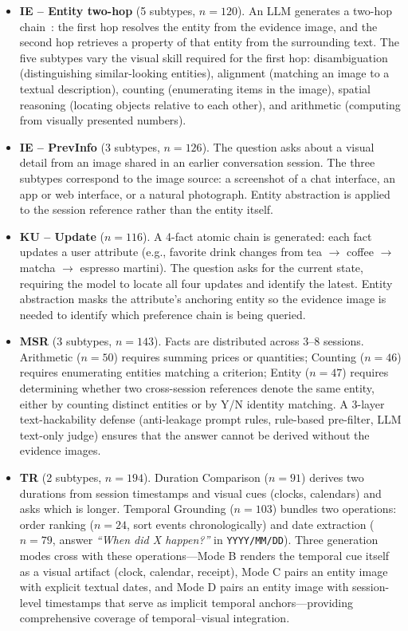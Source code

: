 \documentclass{article}
\begin{document}
\begin{itemize}
    \item \textbf{IE -- Entity two-hop} (5 subtypes, $n=120$). An LLM generates a two-hop chain~\cite{chang2022webqa}: the first hop resolves the entity from the evidence image, and the second hop retrieves a property of that entity from the surrounding text. The five subtypes vary the visual skill required for the first hop: disambiguation (distinguishing similar-looking entities), alignment (matching an image to a textual description), counting (enumerating items in the image), spatial reasoning (locating objects relative to each other), and arithmetic (computing from visually presented numbers).

    \item \textbf{IE -- PrevInfo} (3 subtypes, $n=126$). The question asks about a visual detail from an image shared in an earlier conversation session. The three subtypes correspond to the image source: a screenshot of a chat interface, an app or web interface, or a natural photograph. Entity abstraction is applied to the session reference rather than the entity itself.

    \item \textbf{KU -- Update} ($n=116$). A 4-fact atomic chain is generated: each fact updates a user attribute (e.g., favorite drink changes from tea $\to$ coffee $\to$ matcha $\to$ espresso martini). The question asks for the current state, requiring the model to locate all four updates and identify the latest. Entity abstraction masks the attribute's anchoring entity so the evidence image is needed to identify which preference chain is being queried.

    \item \textbf{MSR} (3 subtypes, $n=143$). Facts are distributed across 3--8 sessions. Arithmetic ($n=50$) requires summing prices or quantities; Counting ($n=46$) requires enumerating entities matching a criterion; Entity ($n=47$) requires determining whether two cross-session references denote the same entity, either by counting distinct entities or by Y/N identity matching. A 3-layer text-hackability defense (anti-leakage prompt rules, rule-based pre-filter, LLM text-only judge) ensures that the answer cannot be derived without the evidence images.

    \item \textbf{TR} (2 subtypes, $n=194$). Duration Comparison ($n=91$) derives two durations from session timestamps and visual cues (clocks, calendars) and asks which is longer. Temporal Grounding ($n=103$) bundles two operations: order ranking ($n=24$, sort events chronologically) and date extraction ($n=79$, answer \emph{``When did X happen?''} in \texttt{YYYY/MM/DD}). Three generation modes cross with these operations---Mode B renders the temporal cue itself as a visual artifact (clock, calendar, receipt), Mode C pairs an entity image with explicit textual dates, and Mode D pairs an entity image with session-level timestamps that serve as implicit temporal anchors---providing comprehensive coverage of temporal--visual integration.
\end{itemize}
\end{document}
